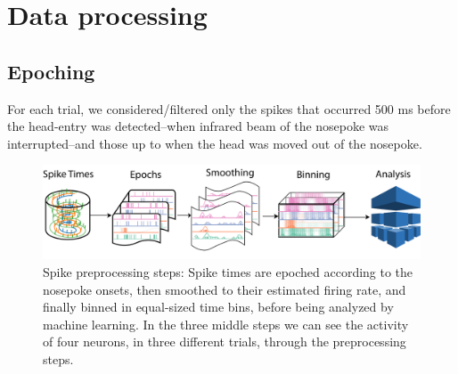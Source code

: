 \chapter{Data processing}
\label{chap:processing}
\section{Epoching}

For each trial, we considered/filtered only the spikes that occurred 500 ms before the head-entry was detected--when infrared beam of the nosepoke was interrupted--and those up to when the head was moved out of the nosepoke. 

\begin{figure}
    \centering
    \includegraphics[width=\textwidth]{figures/Pipeline.png}
    \caption[Spike preprocessing steps]{Spike preprocessing steps: Spike times are epoched according to the nosepoke onsets, then smoothed to their estimated firing rate, and finally binned in equal-sized time bins, before being analyzed by machine learning. In the three middle steps we can see the activity of four neurons, in three different trials, through the preprocessing steps.}
    \label{fig:preproc}
\end{figure} 


